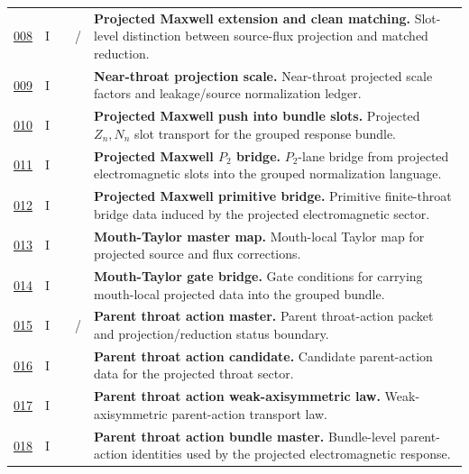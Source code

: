 {\begin{longtable}{@{}L{0.055\textwidth}L{0.075\textwidth}L{0.145\textwidth}L{0.235\textwidth}L{0.43\textwidth}@{}}
\addlinespace
\hyperref[stage:008]{008} & I &  & \StatusExact{} / \StatusReduced{} & \textbf{Projected Maxwell extension and clean matching.} Slot-level distinction between source-flux projection and matched reduction. \\
\addlinespace
\hyperref[stage:009]{009} & I &  & \StatusExactClosure{} & \textbf{Near-throat projection scale.} Near-throat projected scale factors and leakage/source normalization ledger. \\
\addlinespace
\hyperref[stage:010]{010} & I &  & \StatusExactClosure{} & \textbf{Projected Maxwell push into bundle slots.} Projected \(Z_n,N_n\) slot transport for the grouped response bundle. \\
\addlinespace
\hyperref[stage:011]{011} & I &  & \StatusExactClosure{} & \textbf{Projected Maxwell \(P_2\) bridge.} \(P_2\)-lane bridge from projected electromagnetic slots into the grouped normalization language. \\
\addlinespace
\hyperref[stage:012]{012} & I &  & \StatusExactClosure{} & \textbf{Projected Maxwell primitive bridge.} Primitive finite-throat bridge data induced by the projected electromagnetic sector. \\
\addlinespace
\hyperref[stage:013]{013} & I &  & \StatusExactClosure{} & \textbf{Mouth-Taylor master map.} Mouth-local Taylor map for projected source and flux corrections. \\
\addlinespace
\hyperref[stage:014]{014} & I &  & \StatusExactClosure{} & \textbf{Mouth-Taylor gate bridge.} Gate conditions for carrying mouth-local projected data into the grouped bundle. \\
\addlinespace
\hyperref[stage:015]{015} & I &  & \StatusExact{} / \StatusReduced{} & \textbf{Parent throat action master.} Parent throat-action packet and projection/reduction status boundary. \\
\addlinespace
\hyperref[stage:016]{016} & I &  & \StatusExactClosure{} & \textbf{Parent throat action candidate.} Candidate parent-action data for the projected throat sector. \\
\addlinespace
\hyperref[stage:017]{017} & I &  & \StatusExactClosure{} & \textbf{Parent throat action weak-axisymmetric law.} Weak-axisymmetric parent-action transport law. \\
\addlinespace
\hyperref[stage:018]{018} & I &  & \StatusExactClosure{} & \textbf{Parent throat action bundle master.} Bundle-level parent-action identities used by the projected electromagnetic response. \\

\end{longtable}}
